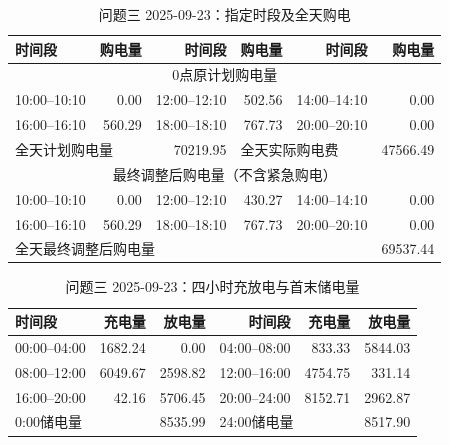 \FloatBarrier
\begin{table}[htbp]\centering\scriptsize
\caption{问题三 2025-09-23：指定时段及全天购电}
\begin{tabular}{lrrrrr}\toprule
时间段 & 购电量 & 时间段 & 购电量 & 时间段 & 购电量\\\midrule
\multicolumn{6}{c}{0点原计划购电量}\\
10:00--10:10 & 0.00 & 12:00--12:10 & 502.56 & 14:00--14:10 & 0.00\\
16:00--16:10 & 560.29 & 18:00--18:10 & 767.73 & 20:00--20:10 & 0.00\\
\multicolumn{2}{l}{全天计划购电量} & 70219.95 & \multicolumn{2}{l}{全天实际购电费} & 47566.49\\
\multicolumn{6}{c}{最终调整后购电量（不含紧急购电）}\\
10:00--10:10 & 0.00 & 12:00--12:10 & 430.27 & 14:00--14:10 & 0.00\\
16:00--16:10 & 560.29 & 18:00--18:10 & 767.73 & 20:00--20:10 & 0.00\\
\multicolumn{5}{l}{全天最终调整后购电量} & 69537.44\\
\bottomrule\end{tabular}\end{table}

\begin{table}[htbp]\centering\scriptsize
\caption{问题三 2025-09-23：四小时充放电与首末储电量}
\begin{tabular}{lrrrrr}\toprule
时间段 & 充电量 & 放电量 & 时间段 & 充电量 & 放电量\\\midrule
00:00--04:00 & 1682.24 & 0.00 & 04:00--08:00 & 833.33 & 5844.03\\
08:00--12:00 & 6049.67 & 2598.82 & 12:00--16:00 & 4754.75 & 331.14\\
16:00--20:00 & 42.16 & 5706.45 & 20:00--24:00 & 8152.71 & 2962.87\\
\multicolumn{2}{l}{0:00储电量} & 8535.99 & \multicolumn{2}{l}{24:00储电量} & 8517.90\\
\bottomrule\end{tabular}\end{table}


